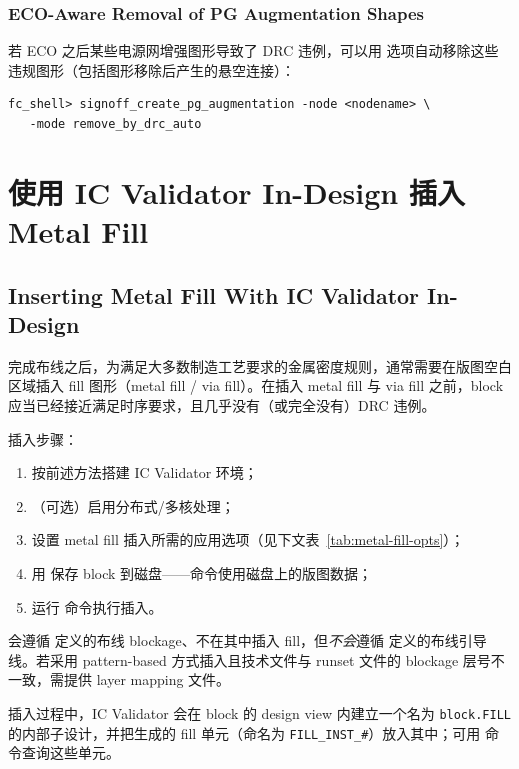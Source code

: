 \subsubsection*{ECO-Aware Removal of PG Augmentation Shapes}

若 ECO 之后某些电源网增强图形导致了 DRC 违例，可以用  选项自动移除这些违规图形（包括图形移除后产生的悬空连接）：

\begin{lstlisting}
fc_shell> signoff_create_pg_augmentation -node <nodename> \
   -mode remove_by_drc_auto
\end{lstlisting}

\section{使用 IC Validator In-Design 插入 Metal Fill}
\subsection*{Inserting Metal Fill With IC Validator In-Design}

完成布线之后，为满足大多数制造工艺要求的金属密度规则，通常需要在版图空白区域插入 fill 图形（metal fill / via fill）。在插入 metal fill 与 via fill 之前，block 应当已经接近满足时序要求，且几乎没有（或完全没有）DRC 违例。

插入步骤：
\begin{enumerate}
  \item 按前述方法搭建 IC Validator 环境；
  \item （可选）启用分布式/多核处理；
  \item 设置 metal fill 插入所需的应用选项（见下文表~\ref{tab:metal-fill-opts}）；
  \item 用 \cmd{save\_block} 保存 block 到磁盘——命令使用磁盘上的版图数据；
  \item 运行  命令执行插入。
\end{enumerate}

\begin{noteBox}
 会遵循  定义的布线 blockage、不在其中插入 fill，但\emph{不会}遵循  定义的布线引导线。若采用 pattern-based 方式插入且技术文件与 runset 文件的 blockage 层号不一致，需提供 layer mapping 文件。
\end{noteBox}

插入过程中，IC Validator 会在 block 的 design view 内建立一个名为 \texttt{block.FILL} 的内部子设计，并把生成的 fill 单元（命名为 \texttt{FILL\_INST\_\#}）放入其中；可用  命令查询这些单元。

